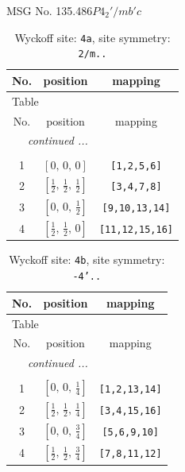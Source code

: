 \documentclass[fleqn,8pt]{jsarticle}
\begin{document}
\setcounter{MaxMatrixCols}{32}

\renewcommand{\tablename}{Table~}
\renewcommand{\figurename}{Figure~}
\begin{center}
\LARGE
MSG No. 135.486\quad$P4_{2}'/mb'c$
\end{center}
\renewcommand{\arraystretch}{1.2}
\begin{longtable}{ccc}
\caption{Wyckoff site: {\tt 4a}, site symmetry: {\tt 2/m..}}
 \\
 \hline \hline
No. & position & mapping \\ \hline \endfirsthead

\multicolumn{2}{l}{\tablename\ \thetable{}} \\
 \hline \hline
No. & position & mapping \\ \hline \endhead

 \hline \hline
\multicolumn{2}{r}{\footnotesize\it continued ...} \\ \endfoot

 \hline \hline
\multicolumn{2}{r}{} \\ \endlastfoot

1 & $\left[ 0,\, 0,\, 0 \right]$ & {\tt [1,2,5,6]} \\ \hline
2 & $\left[ \frac{1}{2},\, \frac{1}{2},\, \frac{1}{2} \right]$ & {\tt [3,4,7,8]} \\ \hline
3 & $\left[ 0,\, 0,\, \frac{1}{2} \right]$ & {\tt [9,10,13,14]} \\ \hline
4 & $\left[ \frac{1}{2},\, \frac{1}{2},\, 0 \right]$ & {\tt [11,12,15,16]} \\
\end{longtable}
\renewcommand{\arraystretch}{1.2}
\begin{longtable}{ccc}
\caption{Wyckoff site: {\tt 4b}, site symmetry: {\tt -4'..}}
 \\
 \hline \hline
No. & position & mapping \\ \hline \endfirsthead

\multicolumn{2}{l}{\tablename\ \thetable{}} \\
 \hline \hline
No. & position & mapping \\ \hline \endhead

 \hline \hline
\multicolumn{2}{r}{\footnotesize\it continued ...} \\ \endfoot

 \hline \hline
\multicolumn{2}{r}{} \\ \endlastfoot

1 & $\left[ 0,\, 0,\, \frac{1}{4} \right]$ & {\tt [1,2,13,14]} \\ \hline
2 & $\left[ \frac{1}{2},\, \frac{1}{2},\, \frac{1}{4} \right]$ & {\tt [3,4,15,16]} \\ \hline
3 & $\left[ 0,\, 0,\, \frac{3}{4} \right]$ & {\tt [5,6,9,10]} \\ \hline
4 & $\left[ \frac{1}{2},\, \frac{1}{2},\, \frac{3}{4} \right]$ & {\tt [7,8,11,12]} \\
\end{longtable}
\end{document}

